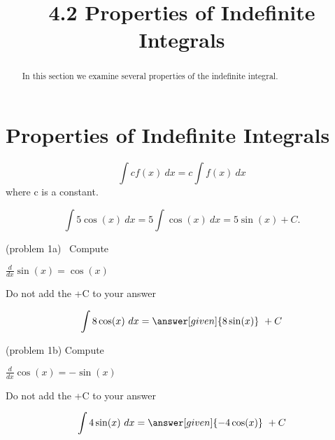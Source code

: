 \documentclass{ximera}
\title{4.2 Properties of Indefinite Integrals}
\begin{document}
\begin{abstract}
In this section we examine several properties of the indefinite integral.
\end{abstract}

\maketitle

\section{Properties of Indefinite Integrals}

\begin{theorem}
\[\int cf(x) \ dx = c\int f(x) \ dx\]
where c is a constant.
\end{theorem}


\begin{example}[example 1]
\[
\int 5\cos(x) \ dx = 5 \int \cos(x) \ dx = 5\sin(x) +C.
\]
\end{example}


\begin{problem}(problem 1a)
\ Compute

\begin{hint}
$\frac{d}{dx} \sin(x) = \cos(x)$
\end{hint}
\begin{hint}
\begin{center}
Do not add the +C to your answer
\end{center}
\end{hint}

\[
\int 8\cos(x) \ dx =
\answer[given]{8\sin(x)} \ +  C
\]
\end{problem}



\begin{problem}(problem 1b)
Compute

\begin{hint}
$\frac{d}{dx} \cos(x) = -\sin(x)$
\end{hint}
\begin{hint}
\begin{center}
Do not add the +C to your answer
\end{center}
\end{hint}

\[
\int 4\sin(x) \ dx =
\answer[given]{-4\cos(x)} \ +  C
\]
\end{problem}
\end{document}
